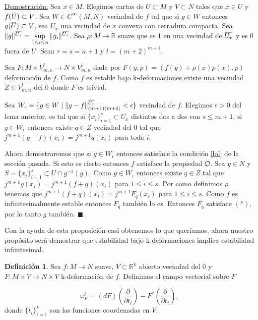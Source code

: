 \documentclass{report}
\theoremstyle{definition}
\newtheorem{defi}[theorem]{Definici\'on}
\newcommand{\overbar}[1]{\mkern 1.5mu\overline{\mkern-1.5mu#1\mkern-1.5mu}\mkern 1.5mu}
\begin{document}
\underline{Demostraci\'on:} Sea $x \in M$. Elegimos cartas de $U \subset M$ y $V \subset N$ tales que $x \in U$ y $f(\overbar{U}) \subset V$. Sea $W \in C^\infty(M,N)$ vecindad de $f$ tal que si $g \in W$ entonces $g(\overbar{U}) \subset V$, sea $U_x$ una vecindad de $x$ convexa con cerradura compacta. Sea $\Vert g \Vert^{\overbar{U_x}} = \sup\limits_{1 \leq i \leq n} \Vert g_i \Vert^{\overbar{U_x}}$. Sea $\rho: M \to \mathbb{R}$ suave que es $1$ en una vecindad de $\overbar{U_x}$ y es $0$ fuera de $U$. Sean $r=s=n+1$ y $l= (m+2)^{m+1}$.

Sea $F: M \times V^l_{m,n} \to N \times V^l_{m,n}$ dada por $F(y,p) = (f(y) + \rho(x)p(x), p)$ deformaci\'on de $f$. Como $f$ es estable bajo k-deformaciones existe una vecindad $Z \in V^l_{m,n}$ del $0$ donde $F$ es trivial.

Sea $W_\epsilon = \{ g \in W \mid \Vert g - f \Vert^{\overbar{U_x}}_{(m+1)(m+2)} < \epsilon \}$ vecindad de $f$. Elegimos $\epsilon >0$ del lema anterior, es tal que si $\{ x_i \}_{i=1}^s \subset U_x$ distintos dos a dos con $s \leq m+1$, si $g \in W_\epsilon$ entonces existe $q \in Z$ vecindad del $0$ tal que $j^{m+1} (g-f)(x_i) = j^{m+1} q(x_i)$ para toda $i$.

Ahora demostraremos que si $g \in W_\epsilon$ entonces satisface la condici\'on \ref{lol} de la secci\'on pasada. Si esto es cierto entonces $f$ satisface la propiedad $\mathfrak{O}$. Sea $y \in N$ y $S= \{ x_i \}_{i=1}^s \subset U \cap g^{-1} (y)$. Como $g \in W_\epsilon$ entonces existe $q \in Z$ tal que $j^{m+1} g(x_i) = j^{m+1} (f+q) (x_i)$ para $1 \leq i \leq s$. Por como definimos $\rho$ tenemos que $j^{m+1}(f+q) (x_i) = j^{m+1} F_q (x_i)$ para $1 \leq i \leq s$. Como $f$ es infinitesimalmente estable entonces $F_q$ tambi\'en lo es. Entonces $F_q$ satisface $(\ast)$, por lo tanto $g$ tambi\'en. $\blacksquare$.

Con la ayuda de esta proposici\'on casi obtenemos lo que quer\'iamos, ahora nuestro prop\'osito ser\'a demostrar que estabilidad bajo k-deformaciones implica estabilidad infinitesimal.

\begin{defi}
Sea $f:M \to N$ suave, $V \subset \mathbb{R}^k$ abierto vecindad del $0$ y $F: M \times V \to N \times V$ k-deformaci\'on de $f$. Definimos el campo vectorial sobre $F$

$$\omega^{i}_F= (dF) \left( \frac{\partial}{\partial t_i} \right) - F^\ast \left( \frac{\partial}{\partial t_i} \right),$$
donde $ \{ t_i \}_{i=1}^k$ son las funciones coordenadas en $V$.
\end{defi}
\end{document}
